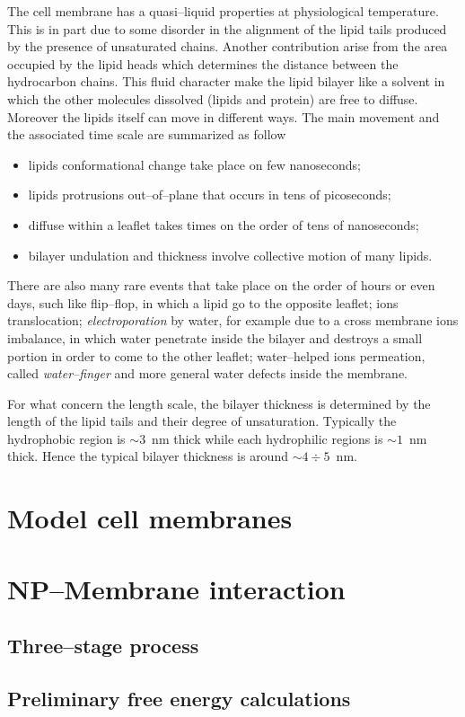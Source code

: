 The cell membrane has a quasi--liquid properties at physiological temperature. This is in part due to some disorder in the alignment of the lipid tails produced by the presence of unsaturated chains. Another contribution arise from the area occupied by the lipid heads which determines the distance between the hydrocarbon chains. This fluid character make the lipid bilayer like a solvent in which the other molecules dissolved (lipids and protein) are free to diffuse. Moreover the lipids itself can move in different ways. The main movement and the associated time scale are summarized as follow
\begin{itemize}
	\item lipids conformational change take place on few nanoseconds;
	\item lipids protrusions out--of--plane that occurs in tens of picoseconds;
	\item diffuse within a leaflet takes times on the order of tens of nanoseconds;
	\item bilayer undulation and thickness involve collective motion of many lipids.
\end{itemize}
There are also many rare events that take place on the order of hours or even days, such like flip--flop, in which a lipid go to the opposite leaflet; ions translocation; \textit{electroporation} by water, for example due to a cross membrane ions imbalance, in which water penetrate inside the bilayer and destroys a small portion in order to come to the other leaflet; water--helped ions permeation, called \textit{water--finger} and more general water defects inside the membrane.

For what concern the length scale, the bilayer thickness is determined by the length of the lipid tails and their degree of unsaturation. Typically the hydrophobic region is $\sim 3$~nm thick while each hydrophilic regions is $\sim 1$~nm thick. Hence the typical bilayer thickness is around $\sim 4\div 5$~nm.

\section{Model cell membranes}



\section{NP--Membrane interaction}

\subsection{Three--stage process}

\subsection{Preliminary free energy calculations}






